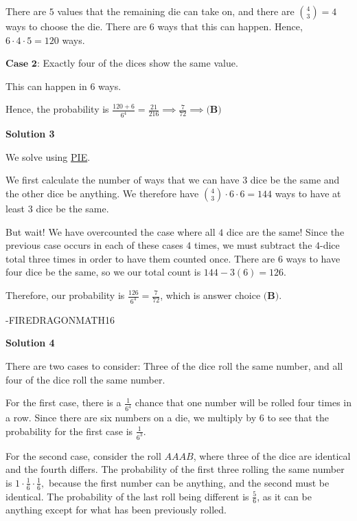 \begin{enumerate}
 There are $5$ values that the remaining die can take on, and there are $\binom{4}{3}=4$ ways to choose the die. There are $6$ ways that this can happen. Hence, $6\cdot 4\cdot5=120$ ways.

 $\textbf{Case 2}$: Exactly four of the dices show the same value.

 This can happen in $6$ ways.

 Hence, the probability is $\frac{120+6}{6^{4}}=\frac{21}{216}\implies \frac{7}{72}\implies \boxed{\textbf{(B)}}$




\textbf{Solution 3}

We solve using \href{https://artofproblemsolving.com/wiki/index.php?title=PIE}{PIE}.

 We first calculate the number of ways that we can have $3$ dice be the same and the other dice be anything. We therefore have $\binom{4}{3} \cdot 6 \cdot 6 = 144$ ways to have at least $3$ dice be the same.

 But wait! We have overcounted the case where all $4$ dice are the same! Since the previous case occurs in each of these cases $4$ times, we must subtract the $4$-dice total three times in order to have them counted once. There are $6$ ways to have four dice be the same, so we our total count is $144 - 3(6) = 126$.

 Therefore, our probability is $\frac{126}{6^4} = \boxed{\frac{7}{72}}$, which is answer choice $\boxed{\textbf{(B)}}$.

 -FIREDRAGONMATH16

 



\textbf{Solution 4}

There are two cases to consider: Three of the dice roll the same number, and all four of the dice roll the same number. 

 
For the first case, there is a $\frac{1}{6^4}$ chance that one number will be rolled four times in a row. Since there are six numbers on a die, we multiply by $6$ to see that the probability for the first case is $\frac{1}{6^3}.$ 

 
For the second case, consider the roll $AAAB$, where three of the dice are identical and the fourth differs. The probability of the first three rolling the same number is $1\cdot{\frac{1}{6}}\cdot{\frac{1}{6}},$ because the first number can be anything, and the second must be identical. The probability of the last roll being different is $\frac{5}{6}$, as it can be anything except for what has been previously rolled.


\end{enumerate}
